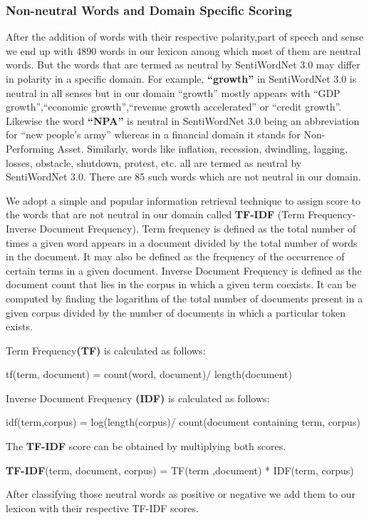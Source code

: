 \documentclass[a4paper, 10pt, conference]{ieeeconf}      %
\begin{document}
\subsubsection{Non-neutral Words and Domain Specific Scoring}
After the addition of words with their respective polarity,part of speech and sense we end up with 4890 words in our lexicon among which most of them are neutral words. But the words that are termed as neutral by SentiWordNet 3.0 may differ in polarity in a specific domain. For example, \textbf{``growth''} in SentiWordNet 3.0 is neutral in all senses but in our domain ``growth'' mostly appears with ``GDP growth'',``economic growth'',``revenue growth accelerated'' or ``credit growth''. Likewise the word \textbf{``NPA''} is neutral in SentiWordNet 3.0 being an abbreviation for ``new people's army'' whereas in a financial domain it stands for Non-Performing Asset. Similarly, words like inflation, recession, dwindling, lagging, losses, obstacle, shutdown, protest, etc. all are termed as neutral by SentiWordNet 3.0. There are 85 such words which are not neutral in our domain.

We adopt a simple and popular information retrieval technique to assign score to the words that are not neutral in our domain called \textbf{TF-IDF} (Term Frequency-Inverse
Document Frequency)\cite{c7}. Term frequency is defined as the total number of times a given word appears
in a document divided by the total number of words in the document. It may also be defined as the
frequency of the occurrence of certain terms in a given document. Inverse Document Frequency is defined as the
document count that lies in the corpus in which a given term coexists.
It can be computed by finding the logarithm of the total number of documents
present in a given corpus divided by the number of documents in which a particular
token exists.

Term Frequency\textbf{(TF)} is calculated as follows:

	tf(term, document) = count(word, document)/ length(document)

	
Inverse Document Frequency \textbf{(IDF)} is calculated as follows:

	idf(term,corpus) = log(length(corpus)/ 	count(document containing term, corpus)


The \textbf{TF-IDF} score can be obtained by multiplying both scores. 

	\textbf{TF-IDF}(term, document, corpus) = TF(term ,document)
	 * IDF(term, corpus)
	 
After classifying those neutral words as positive or negative we add them to our lexicon with their respective TF-IDF scores.
\end{document}
